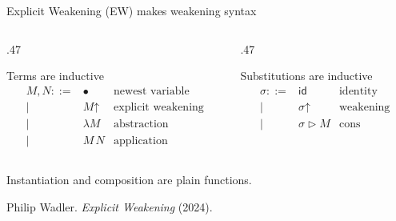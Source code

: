 \documentclass[pdftex,aspectratio=169]{beamer}
\newcommand{\Blob}{\ensuremath{\bullet}}
\newcommand{\Wk}{\ensuremath{\mathord{\uparrow}}}
\newcommand{\source}[1]{\vfill{\scriptsize\color{muted}#1}}
\begin{document}
\begin{frame}{Explicit Weakening (EW) makes weakening syntax}
  \begin{columns}[T,onlytextwidth]
    \begin{column}{.47\textwidth}
      \begin{block}{Terms are inductive}
        \vspace{-\baselineskip}
        \[
        \begin{array}{rcl}
          M,N ::= & \Blob & \text{newest variable}\\
                 \mid& M\Wk & \text{explicit weakening}\\
                 \mid& \lambda M & \text{abstraction}\\
                 \mid& M\,N & \text{application}
        \end{array}
        \]
      \end{block}
    \end{column}
    \begin{column}{.47\textwidth}
      \begin{block}{Substitutions are inductive}
        \[
        \begin{array}{rcl}
          \sigma ::= & \mathsf{id} & \text{identity}\\
                     \mid& \sigma\Wk & \text{weakening}\\
                     \mid& \sigma\mathbin{\rhd}M & \text{cons}
        \end{array}
        \]
      \end{block}
    \end{column}
  \end{columns}

  \vspace{.6em}
  \centering
  Instantiation and composition are plain functions.

  \source{Philip Wadler. \emph{Explicit Weakening} (2024).}
\end{frame}
\end{document}
